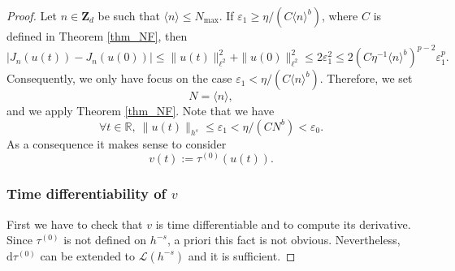 \documentclass[11pt]{article}
\theoremstyle{definition}
\begin{document}
\begin{proof} Let $n\in \mathbf{Z}_d$ be such that $\langle n \rangle \leq N_{\max}$. If $\varepsilon_1 \geq \eta /(C \langle n \rangle^{b})$, where $C$ is defined in Theorem \ref{thm_NF}, then
\[
|J_n(u(t))-J_n(u(0))| \leq \|u(t) \|_{\ell^2}^2 + \|u(0) \|_{\ell^2}^2 \leq 2 \varepsilon_1^2
\leq 2 (C \eta^{-1}\langle n \rangle^{b})^{p-2} \varepsilon_1^p.
\]
Consequently, we only have focus on the case $\varepsilon_1 < \eta /(C \langle n \rangle^{b})$. Therefore, we set
\[
N= \langle n \rangle,
\]
and we apply Theorem \ref{thm_NF}. Note that we have\vspace*{-3pt}
\[
\forall t \in \mathbb{R}, \ \| u(t) \|_{h^s}\leq \varepsilon_1 < \eta /(C N^{b}) <\varepsilon_0.
\]
As a consequence it makes sense to consider\vspace*{-3pt}
\[
v(t):= \tau^{(0)}(u(t)).
\]

\subsubsection*{Time differentiability of $v$}
First we have to check that $v$ is time differentiable and to compute its derivative. Since $\tau^{(0)}$ is not defined on $h^{-s}$, a priori this fact is not obvious. Nevertheless, $\mathrm{d}\tau^{(0)}$ can be extended to $\mathscr{L}(h^{-s})$ and it is sufficient.


\end{proof}
\end{document}
